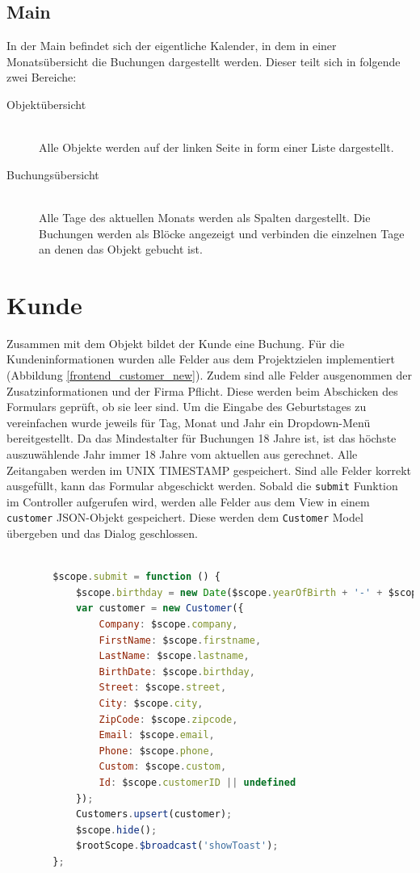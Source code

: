 \subsection{Main}
In der Main befindet sich der eigentliche Kalender, in dem in einer Monatsübersicht die Buchungen dargestellt werden. 
Dieser teilt sich in folgende zwei Bereiche:
\begin{description}
\item[Objektübersicht]\hfill \\
Alle Objekte werden auf der linken Seite in form einer Liste dargestellt.
\item[Buchungsübersicht]\hfill \\ 
Alle Tage des aktuellen Monats werden als Spalten dargestellt. Die Buchungen werden als Blöcke angezeigt und verbinden die einzelnen Tage an denen das Objekt gebucht ist.  
\end{description}

\section{Kunde}
Zusammen mit dem Objekt bildet der Kunde eine Buchung. Für die Kundeninformationen wurden alle Felder aus dem Projektzielen
implementiert (Abbildung \ref{frontend_customer_new}). Zudem sind alle Felder ausgenommen der Zusatzinformationen und der Firma Pflicht.
Diese werden beim Abschicken des Formulars geprüft, ob sie leer sind. Um die Eingabe des Geburtstages zu vereinfachen wurde jeweils für Tag,
 Monat und Jahr ein Dropdown-Menü bereitgestellt. Da das Mindestalter für Buchungen 18 Jahre ist, ist das höchste auszuwählende Jahr immer 18
 Jahre vom aktuellen aus gerechnet. Alle Zeitangaben werden im UNIX TIMESTAMP gespeichert. Sind alle Felder korrekt ausgefüllt, kann das Formular
 abgeschickt werden. Sobald die \texttt{submit} Funktion im Controller aufgerufen wird, werden alle Felder aus dem View in einem \texttt{customer}
 JSON-Objekt gespeichert. Diese werden dem \texttt{Customer} Model übergeben und das Dialog geschlossen.

\begin{lstlisting}[language=JavaScript, label=code_exampleRegistrationRequest, caption=Beispielhafte Antwort auf eine Registrierungsanfrage]

		$scope.submit = function () {
            $scope.birthday = new Date($scope.yearOfBirth + '-' + $scope.monthOfBirth + '-' + $scope.dayOfBirth).getTime();
            var customer = new Customer({
                Company: $scope.company,
                FirstName: $scope.firstname,
                LastName: $scope.lastname,
                BirthDate: $scope.birthday,
                Street: $scope.street,
                City: $scope.city,
                ZipCode: $scope.zipcode,
                Email: $scope.email,
                Phone: $scope.phone,
                Custom: $scope.custom,
                Id: $scope.customerID || undefined
            });
            Customers.upsert(customer);
            $scope.hide();
            $rootScope.$broadcast('showToast');
        };
\end{lstlisting}

